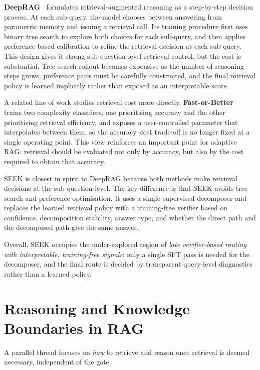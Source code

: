 \documentclass{nthu_thesis}
\begin{document}
\begin{thesiscjk}
\textbf{DeepRAG}~\cite{deeprag} formulates retrieval-augmented reasoning as a step-by-step decision process. At each sub-query, the model chooses between answering from parametric memory and issuing a retrieval call. Its training procedure first uses binary tree search to explore both choices for each sub-query, and then applies preference-based calibration to refine the retrieval decision at each sub-query. This design gives it strong sub-question-level retrieval control, but the cost is substantial. Tree-search rollout becomes expensive as the number of reasoning steps grows, preference pairs must be carefully constructed, and the final retrieval policy is learned implicitly rather than exposed as an interpretable score.

A related line of work studies retrieval cost more directly. \textbf{Fast-or-Better}~\cite{fastorbetter} trains two complexity classifiers, one prioritising accuracy and the other prioritising retrieval efficiency, and exposes a user-controlled parameter that interpolates between them, so the accuracy--cost trade-off is no longer fixed at a single operating point. This view reinforces an important point for adaptive RAG: retrieval should be evaluated not only by accuracy, but also by the cost required to obtain that accuracy.

SEEK is closest in spirit to DeepRAG because both methods make retrieval decisions at the sub-question level. The key difference is that SEEK avoids tree search and preference optimisation. It uses a single supervised decomposer and replaces the learned retrieval policy with a training-free verifier based on confidence, decomposition stability, answer type, and whether the direct path and the decomposed path give the same answer.

Overall, SEEK occupies the under-explored region of \emph{late verifier-based routing with interpretable, training-free signals}: only a single SFT pass is needed for the decomposer, and the final route is decided by transparent query-level diagnostics rather than a learned policy.

\section{Reasoning and Knowledge Boundaries in RAG}
\label{sec:reasoning-rag}
\label{sec:knowledge-boundary}

A parallel thread focuses on \emph{how} to retrieve and reason once retrieval is deemed necessary, independent of the gate.


\end{thesiscjk}
\end{document}
